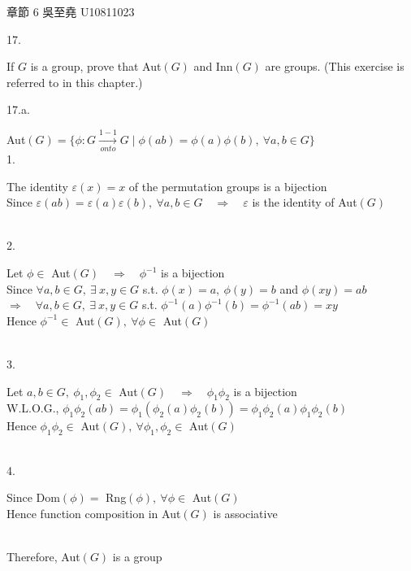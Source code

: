 \documentclass[12pt]{book}
\author{andersonwu2000}
\begin{document}
\begin{CJK}{UTF8}{bsmi}

\hfill 章節 6 吳至堯 U10811023


17. \begin{minipage}[t]{\dimexpr\linewidth-2em}
If $G$ is a group, prove that Aut$(G)$ and Inn$(G)$ are groups. (This exercise is referred to in this chapter.) \\
\end{minipage}

17.a. \begin{minipage}[t]{\dimexpr\linewidth-2em}
Aut$(G)=\{\phi:G\xrightarrow[onto]{1-1}G\mid \phi(ab)=\phi(a)\phi(b),\ \forall a,b\in G\}$ \\
1. \begin{minipage}[t]{\dimexpr\linewidth}
The identity $\varepsilon(x)=x$ of the permutation groups is a bijection \\
Since $\varepsilon(ab)=\varepsilon(a)\varepsilon(b),\ \forall a,b\in G\quad\Rightarrow\quad\varepsilon$ is the identity of Aut$(G)$
\end{minipage} \\[5pt]
2. \begin{minipage}[t]{\dimexpr\linewidth}
Let $\phi\in$ Aut$(G)\quad\Rightarrow\quad\phi^{-1}$ is a bijection \\
Since $\forall a,b\in G,\ \exists\ x,y\in G$ s.t. $\phi(x)=a,\ \phi(y)=b$ and $\phi(xy)=ab$ \\
$\Rightarrow\quad\forall a,b\in G,\ \exists\ x,y\in G$ s.t. $\phi^{-1}(a)\phi^{-1}(b)=\phi^{-1}(ab)=xy$ \\
Hence $\phi^{-1}\in$ Aut$(G),\ \forall\phi\in$ Aut$(G)$
\end{minipage} \\[5pt]
3. \begin{minipage}[t]{\dimexpr\linewidth}
Let $a,b\in G,\ \phi_1,\phi_2\in$ Aut$(G)\quad\Rightarrow\quad\phi_1\phi_2$ is a bijection \\
W.L.O.G., $\phi_1\phi_2(ab)=\phi_1(\phi_2(a)\phi_2(b))=\phi_1\phi_2(a)\phi_1\phi_2(b)$ \\
Hence $\phi_1\phi_2\in$ Aut$(G),\ \forall\phi_1,\phi_2\in$ Aut$(G)$
\end{minipage} \\[5pt]
4. \begin{minipage}[t]{\dimexpr\linewidth}
Since Dom$(\phi)=$ Rng$(\phi),\ \forall\phi\in$ Aut$(G)$ \\
Hence function composition in Aut$(G)$ is associative
\end{minipage} \\[5pt]
Therefore, Aut$(G)$ is a group
\end{minipage} \\


\end{CJK}
\end{document}
